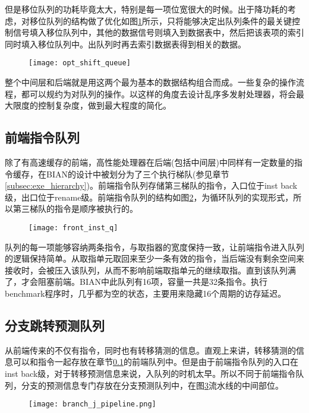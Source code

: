 但是移位队列的功耗毕竟太大，特别是每一项位宽很大的时候。出于降功耗的考虑，对移位队列的结构做了优化如图\ref{fig:opt_shift_q}所示，只将能够决定出队列条件的最关键控制信号填入移位队列中，其他的数据信号则填入到数据表中，然后把该表项的索引同时填入移位队列中。出队列时再去索引数据表得到相关的数据。
\begin{figure}[!htbp]
	\centering
	\texttt{[image: opt\_shift\_queue]}
	\label{fig:opt_shift_q}
\end{figure}


整个中间层和后端就是用这两个最为基本的数据结构组合而成。一些复杂的操作流程，都可以规约为对队列的操作。以这样的角度去设计乱序多发射处理器，将会最大限度的控制复杂度，做到最大程度的简化。

\subsection{前端指令队列}\label{subsec:frontq}
除了有高速缓存的前端，高性能处理器在后端(包括中间层)中同样有一定数量的指令缓存，在BIAN的设计中被划分为了三个执行梯队(参见章节\ref{subsec:exe_hierarchy})。前端指令队列存储第三梯队的指令，入口位于inst back级，出口位于rename级。前端指令队列的结构如图\ref{fig:front_q}，为循环队列的实现形式，所以第三梯队的指令是顺序被执行的。
\begin{figure}[!htbp]
	\centering
	\texttt{[image: front\_inst\_q]}
	\label{fig:front_q}
\end{figure}

队列的每一项能够容纳两条指令，与取指器的宽度保持一致，让前端指令进入队列的逻辑保持简单。从取指单元取回来至少一条有效的指令，当后端没有剩余空间来接收时，会被压入该队列，从而不影响前端取指单元的继续取指。直到该队列满了，才会阻塞前端。BIAN中此队列有16项，容量一共是32条指令。执行benchmark程序时，几乎都为空的状态，主要用来隐藏16个周期的访存延迟。

\subsection{分支跳转预测队列}

从前端传来的不仅有指令，同时也有转移猜测的信息。直观上来讲，转移猜测的信息可以和指令一起存放在章节\ref{subsec:frontq}的前端队列中。但是由于前端指令队列的入口在inst back级，对于转移预测信息来说，入队列的时机太早。所以不同于前端指令队列，分支的预测信息专门存放在分支预测队列中，在图\ref{fig:predict_q}流水线的中间部位。
\begin{figure}[!htbp]
	\centering
	\texttt{[image: branch\_j\_pipeline.png]}
	\label{fig:predict_q}
\end{figure}

